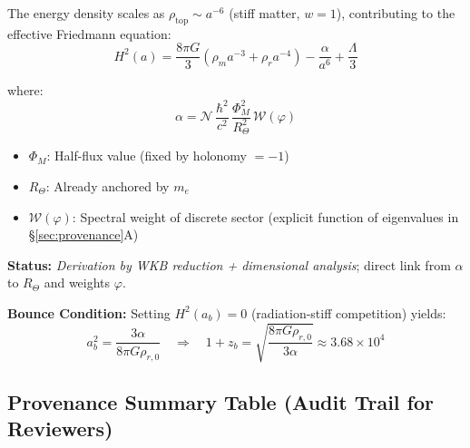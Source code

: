 \documentclass[12pt]{article}
\theoremstyle{definition}
\theoremstyle{plain}
\begin{document}
The energy density scales as $\rho_{\text{top}} \sim a^{-6}$ (stiff matter, $w = 1$), contributing to the effective Friedmann equation:
\begin{equation}
H^2(a) = \frac{8\pi G}{3} \left(\rho_m a^{-3} + \rho_r a^{-4}\right) - \frac{\alpha}{a^6} + \frac{\Lambda}{3}
\end{equation}

where:
\begin{equation}
\alpha = \mathcal{N} \, \frac{\hbar^2}{c^2} \, \frac{\Phi_M^2}{R_\Theta^2} \, \mathcal{W}(\varphi)
\end{equation}

\begin{itemize}
\item $\Phi_M$: Half-flux value (fixed by holonomy $= -1$)
\item $R_\Theta$: Already anchored by $m_e$
\item $\mathcal{W}(\varphi)$: Spectral weight of discrete sector (explicit function of eigenvalues in \S\ref{sec:provenance}A)
\end{itemize}

\textbf{Status:} \textit{Derivation by WKB reduction + dimensional analysis}; direct link from $\alpha$ to $R_\Theta$ and weights $\varphi$.

\textbf{Bounce Condition:} Setting $H^2(a_b) = 0$ (radiation-stiff competition) yields:
\begin{equation}
a_b^2 = \frac{3\alpha}{8\pi G \rho_{r,0}} \quad \Rightarrow \quad 1+z_b = \sqrt{\frac{8\pi G \rho_{r,0}}{3\alpha}} \approx 3.68 \times 10^4
\end{equation}

\subsection{Provenance Summary Table (Audit Trail for Reviewers)}
\end{document}
